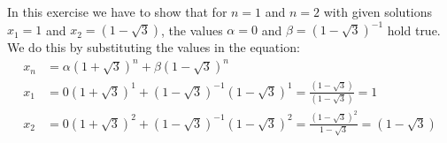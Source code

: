 In this exercise we have to show that for $n = 1$ and $n = 2$ with given solutions $x_1 = 1$ and $x_2 = (1-\sqrt{3})$, the values $\alpha = 0$ and $\beta = (1-\sqrt{3})^{-1}$ hold true. We do this by substituting the values in the equation:
\begin{align*}
  x_n &= \alpha(1+\sqrt{3})^n + \beta(1-\sqrt{3})^n \\
  x_1 &= 0(1+\sqrt{3})^1 + (1-\sqrt{3})^{-1}(1-\sqrt{3})^1 = \frac{(1-\sqrt{3})}{(1-\sqrt{3})} = 1 \\
  x_2 &= 0(1+\sqrt{3})^2 + (1-\sqrt{3})^{-1}(1-\sqrt{3})^2 = \frac{(1-\sqrt{3})^2}{1-\sqrt{3}} = (1-\sqrt{3})\\
\end{align*}

